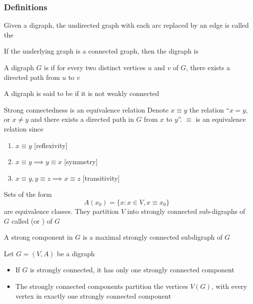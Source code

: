 \documentclass[aspectratio=169]{beamer}\usepackage[]{graphicx}\usepackage[]{xcolor}
\begin{document}
\begin{frame}\frametitle{Definitions}
	\begin{definition}
	Given a digraph, the undirected graph with each arc replaced by an edge is called the 
	\end{definition}
	\vfill
	\begin{definition}
	If the underlying graph is a connected graph, then the digraph is 
	\end{definition}
	\vfill
	\begin{definition}
	A digraph $G$ is  if for every two distinct vertices $u$ and $v$ of $G$, there exists a directed path from $u$ to $v$
	\end{definition}
	\vfill
	\begin{definition}
	A digraph is said to be  if it is not weakly connected
	\end{definition}
\end{frame}

\begin{frame}{Strong connectedness is an equivalence relation}
Denote $x\equiv y$ the relation  ``$x=y$, or $x\neq y$ and there exists a directed path in $G$ from $x$ to $y$''. $\equiv$ is an equivalence relation since
\begin{enumerate}
	\item $x\equiv y$ \hfill[reflexivity]
	\item $x\equiv y\implies y\equiv x$ \hfill[symmetry]
	\item $x\equiv y, y\equiv z\implies x\equiv z$ \hfill[transitivity]
\end{enumerate}
\begin{definition}
	\label{def:strong_components}
	Sets of the form 
	\[
	A(x_0)=\{x:x\in V, x\equiv x_0\}	
	\]
	are equivalence classes. 
	They partition $V$ into strongly connected sub-digraphs of $G$ called  (or ) of $G$
\end{definition}
A strong component in $G$ is a maximal strongly connected subdigraph of $G$
\end{frame}


\begin{frame}
	\begin{theorem}[Properties]
		Let $G=(V,A)$ be a digraph
	\begin{itemize}
	\item If $G$ is strongly connected, it has only one strongly connected component
	\item The strongly connected components partition the vertices $V(G)$, with every vertex in exactly one strongly connected component
	\end{itemize}
	\end{theorem}
\end{frame}
\end{document}

